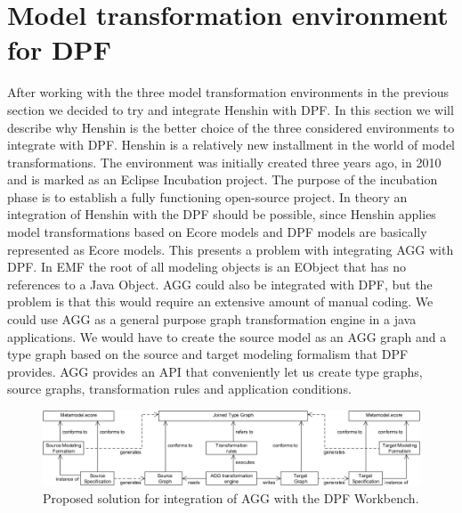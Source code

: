 \section{Model transformation environment for DPF}
\label{tool_choice}

After working with the three model transformation environments in the previous
section we decided to try and integrate Henshin with DPF. In this section we
will describe why Henshin is the better choice of the three considered
environments to integrate with DPF. Henshin\cite{Henshin_2010,Henshin} is a
relatively new installment in the world of model transformations. The
environment was initially created three years ago, in 2010 and is marked as an
Eclipse Incubation project. The purpose of the incubation phase is to establish
a fully functioning open-source project. In theory an integration of Henshin
with the DPF should be possible, since Henshin applies model transformations
based on Ecore models and DPF models are basically represented as Ecore
models. This presents a problem with integrating AGG with DPF. In EMF the root
of all modeling objects is an EObject that has no references to a Java Object. 
AGG could also be integrated with DPF, but the problem is that this would
require an extensive amount of manual coding. We could use AGG as a general
purpose graph transformation engine in a java applications. We would have to
create the source model as an AGG graph and a type graph based on the source and
target modeling formalism that DPF provides. AGG provides an API that
conveniently let us create type graphs, source graphs, transformation rules and
application conditions.
 
\begin{figure}[H]
	\centering
	\includegraphics[scale=0.52]{figures/AGG_solution.png}
	\caption[Proposed solution for integration of AGG]
	{Proposed solution for integration of AGG with the DPF Workbench.}
	\label{fig:AGG_Solution}
\end{figure}

